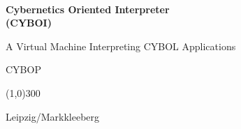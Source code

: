 %
%
%
%
%

\begin{center}
    \begin{Large}
        \authormacro\\
    \end{Large}
    \vspace*{1cm}
    \begin{huge}
        \textbf{Cybernetics Oriented Interpreter\\
        (CYBOI)}\\
    \end{huge}
    \vspace{1cm}
    \begin{normalsize}
        A Virtual Machine Interpreting CYBOL Applications\\
    \end{normalsize}
    \vspace{9cm}
    \begin{normalsize}
        CYBOP\\
    \end{normalsize}
    \line(1,0){300}\\
    \begin{small}
        Leipzig/Markkleeberg
    \end{small}
\end{center}
